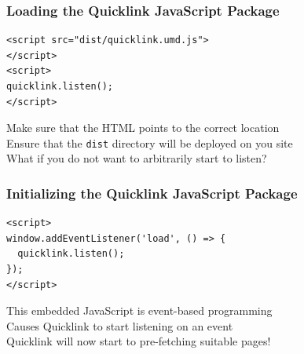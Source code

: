 \documentclass[14pt,aspectratio=169]{beamer}
\begin{document}
%
\begin{frame}[fragile]
  \frametitle{Loading the Quicklink JavaScript Package}
  \normalsize
  \begin{minipage}{6in}
    \vspace*{.2in}
    \begin{verbatim}
<script src="dist/quicklink.umd.js">
</script>
<script>
quicklink.listen();
</script>
    \end{verbatim}
  \end{minipage}
  \vspace*{.1in}
  \begin{center}
    Make sure that the HTML points to the correct location \\
    Ensure that the {\tt dist} directory will be deployed on you site \\
    What if you do not want to arbitrarily start to listen? \\
  \end{center}
\end{frame}

%
\begin{frame}[fragile]
  \frametitle{Initializing the Quicklink JavaScript Package}
  \normalsize
  \begin{minipage}{6in}
    \vspace*{.2in}
    \begin{verbatim}
<script>
window.addEventListener('load', () => {
  quicklink.listen();
});
</script>
    \end{verbatim}
  \end{minipage}
  \vspace*{.1in}
  \begin{center}
    This embedded JavaScript is event-based programming \\
    Causes Quicklink to start listening on an event \\
    Quicklink will now start to pre-fetching suitable pages! \\
  \end{center}
\end{frame}
\end{document}
